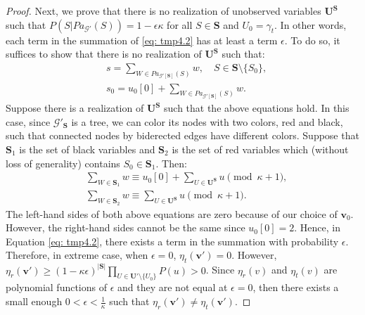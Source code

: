 \documentclass[accepted]{uai2022}
\newcommand{\Pa}[2]{\textit{Pa}_{#2}(#1)}
\newcommand{\U}[0]{\mathbf{U}}
\newcommand{\G}[0]{\mathcal{G}}
\begin{document}
\begin{proof}
        Next, we prove that there is no realization of unobserved variables $\U^{\mathbf{S}}$ such that $P(S|\Pa{S}{\G'})=1-\epsilon\kappa$ for all $S\in \mathbf{S}$ and $U_0=\gamma_t$.
        In other words, each term in the summation of \eqref{eq: tmp4.2} has at least a term $\epsilon$. 
        To do so, it suffices to show that there is no realization of $\U^{\mathbf{S}}$ such that:
        \begin{equation*}
            \begin{split}
                & s = \sum_{W \in \Pa{S}{\G'[\mathbf{S}]}} w, \quad S\in \mathbf{S}\setminus \{S_0\},\\
                & s_0 = u_0[0] + \sum_{W \in \Pa{S}{\G'[\mathbf{S}]}} w.
            \end{split}
        \end{equation*}
        Suppose there is a realization of $\U^{\mathbf{S}}$ such that the above equations hold. In this case, since $\G'_{\mathbf{S}}$ is a tree, we can color its nodes with two colors, red and black, such that connected nodes by biderected edges have different colors. 
        Suppose that $\mathbf{S}_1$ is the set of black variables and $\mathbf{S}_2$ is the set of red variables which (without loss of generality) contains $S_0 \in \mathbf{S}_1$.
        Then:
        \begin{equation*}
            \begin{split}
                & \sum_{W\in \mathbf{S}_1} w \equiv u_0[0] + \sum_{U\in \U^{\mathbf{S}}} u \pmod{\kappa+1},\\
                & \sum_{W\in \mathbf{S}_2} w \equiv  \sum_{U\in \U^{\mathbf{S}}} u \pmod{\kappa+1}.
            \end{split}
        \end{equation*}
        The left-hand sides of both above equations are zero because of our choice of $\textbf{v}_0$.
        However, the right-hand sides cannot be the same since $u_0[0]=2$.
        Hence, in Equation \eqref{eq: tmp4.2}, there exists a term in the summation with probability $\epsilon$.
        Therefore, in extreme case, when $\epsilon=0$, $\eta_{t}(\mathbf{v}')=0$. However, 
        $\eta_{r}(\mathbf{v}')\geq (1-\kappa\epsilon)^{|\mathbf{S}|}\prod_{U\in \U'\setminus \{U_0\}}\! P(u)>0$. 
        Since $\eta_{r}(v)$ and $\eta_{t}(v)$ are polynomial functions of $\epsilon$ and they are not equal at $\epsilon=0$, then there exists a small enough $0<\epsilon<\frac{1}{\kappa}$ such that $\eta_{r}(\mathbf{v}') \neq \eta_{t}(\mathbf{v}')$.
    \end{proof}
    
\end{document}
